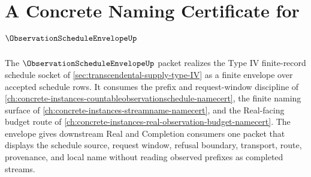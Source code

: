\chapter{A Concrete Naming Certificate for $\ObservationScheduleEnvelopeUp$}
\label{ch:concrete-instances-observationscheduleenvelope-namecert}

The $\ObservationScheduleEnvelopeUp$ packet realizes the Type IV finite-record schedule socket of \autoref{sec:transcendental-supply-type-IV} as a finite envelope over accepted schedule rows. It consumes the prefix and request-window discipline of \autoref{ch:concrete-instances-countableobservationschedule-namecert}, the finite naming surface of \autoref{ch:concrete-instances-streamname-namecert}, and the Real-facing budget route of \autoref{ch:concrete-instances-real-observation-budget-namecert}. The envelope gives downstream Real and Completion consumers one packet that displays the schedule source, request window, refusal boundary, transport, route, provenance, and local name without reading observed prefixes as completed streams.



